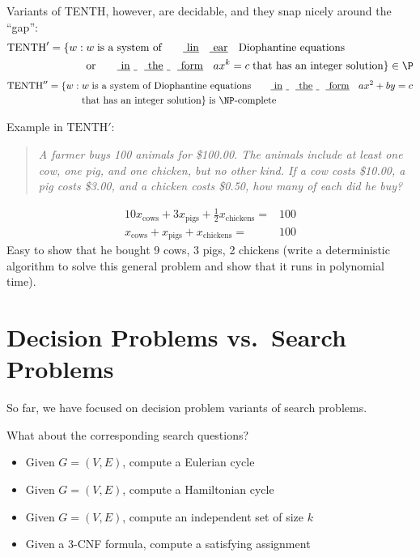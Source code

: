 \documentclass[a4paper]{report}
\theoremstyle{definition}
\begin{document}
Variants of TENTH, however, are decidable, and they snap nicely around the ``gap'':
%
\begin{align*}
\text{TENTH}' = \{ w : & \; w \; \text{is a system of \myul{linear} Diophantine equations}\\ & \;\text{or \myul{in the form}} \; ax^k = c \; \text{that has an integer solution} \} \in \P
\end{align*}
%
\begin{align*}
\text{TENTH}'' = \{ w : & \; w \; \text{is a system of Diophantine equations \myul{in the form}} \; ax^2 + by = c\\ & \; \text{that has an integer solution} \} \;\text{is \NP-complete}
\end{align*}

Example in $\text{TENTH}'$:
%
\begin{quote} {\em A farmer buys 100 animals for \$100.00. The animals include at least one cow, one pig, and one chicken, but no other kind.  If a cow costs \$10.00, a pig costs \$3.00, and a chicken costs \$0.50, how many of each did he buy?}
\end{quote}
%
\begin{align*}
10x_{\text{cows}} + 3x_{\text{pigs}} + \frac{1}{2}x_{\text{chickens}} = & 100\\
x_{\text{cows}} + x_{\text{pigs}} + x_{\text{chickens}} = & 100
\end{align*}
%
Easy to show that he bought 9 cows, 3 pigs, 2 chickens (write a deterministic algorithm to solve this general problem and show that it runs in polynomial time).

\section{Decision Problems vs.~Search Problems}
So far, we have focused on decision problem variants of search problems.

What about the corresponding search questions?
\begin{itemize}
\item Given $G = (V,E)$, compute a Eulerian cycle
\item Given $G = (V,E)$, compute a Hamiltonian cycle
\item Given $G = (V,E)$, compute an independent set of size $k$
\item Given a 3-CNF formula, compute a satisfying assignment
\end{itemize}
\end{document}
